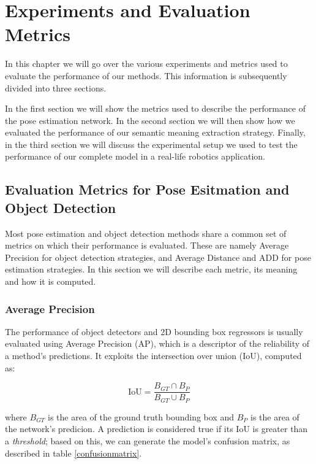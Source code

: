 \chapter{Experiments and Evaluation Metrics}

In this chapter we will go over the various experiments and metrics used to evaluate the performance of our methods. This information is subsequently divided into three sections.

In the first section we will show the metrics used to describe the performance of the pose estimation network. In the second section we will then show how we evaluated the performance of our semantic meaning extraction strategy. Finally, in the third section we will discuss the experimental setup we used to test the performance of our complete model in a real-life robotics application.

\section{Evaluation Metrics for Pose Esitmation and Object Detection}

Most pose estimation and object detection methods share a common set of metrics on which their performance is evaluated. These are namely Average Precision for object detection strategies, and Average Distance and ADD for pose estimation strategies. In this section we will describe each metric, its meaning and how it is computed.

\subsection{Average Precision}

The performance of object detectors and 2D bounding box regressors is usually evaluated using Average Precision (AP), which is a descriptor of the reliability of a method's predictions. It exploits the intersection over union (IoU), computed as:

\begin{equation*}
    \text{IoU} = \frac{B_{GT} \cap B_{P}}{B_{GT} \cup B_{P}}
    \label{eq:IoU}
\end{equation*}

where $B_{GT}$ is the area of the ground truth bounding box and $B_{P}$ is the area of the network's predicion. A prediction is considered true if its IoU is greater than a \emph{threshold}; based on this, we can generate the model's confusion matrix, as described in table \ref{confusionmatrix}.


